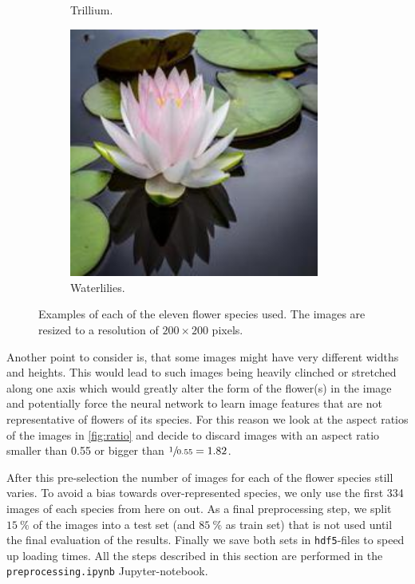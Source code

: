 \begin{figure}
\begin{subfigure}{0.24\textwidth}
        \caption{Trillium.}
    \end{subfigure}
    \begin{subfigure}{0.24\textwidth}
        \centering
        \includegraphics[width=0.9\textwidth]{../example_images/Waterlilies.jpg}
        \caption{Waterlilies.}
    \end{subfigure}
    \caption{Examples of each of the eleven flower species used. The images are resized to a resolution of $200\times200$ pixels.}
    \label{fig:images}
\end{figure}

Another point to consider is, that some images might have very different widths and heights.
This would lead to such images being heavily clinched or stretched along one axis which would greatly alter the form of the flower(s) in the image and potentially force the neural network 
to learn image features that are not representative of flowers of its species.
For this reason we look at the aspect ratios of the images in \autoref{fig:ratio} and decide to discard images with an aspect ratio smaller than 0.55 or bigger than $\sfrac{1}{0.55} = 1.82$. 

After this pre-selection the number of images for each of the flower species still varies.
To avoid a bias towards over-represented species, we only use the first 334 images of each species from here on out.
As a final preprocessing step, we split $\SI{15}{\percent}$ of the images into a test set (and $\SI{85}{\percent}$ as train set) that is not used until the final evaluation of the results.
Finally we save both sets in \texttt{hdf5}-files to speed up loading times.
All the steps described in this section are performed in the \texttt{preprocessing.ipynb} Jupyter-notebook.